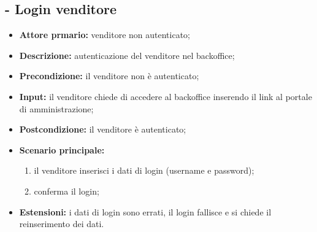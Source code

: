 \subsection{ - Login venditore}
\begin{itemize}
    \item \textbf{Attore prmario:} venditore non autenticato;
    \item \textbf{Descrizione:} autenticazione del venditore nel backoffice;
    \item \textbf{Precondizione:} il venditore non è autenticato;
    \item \textbf{Input:} il venditore chiede di accedere al backoffice inserendo il link al portale di amministrazione;
    \item \textbf{Postcondizione:} il venditore è autenticato;
    \item \textbf{Scenario principale:}
          \begin{enumerate}
              \item il venditore inserisci i dati di login (username e password);
              \item conferma il login;
          \end{enumerate}
    \item \textbf{Estensioni:} i dati di login sono errati, il login fallisce e si chiede il reinserimento dei dati.
\end{itemize}